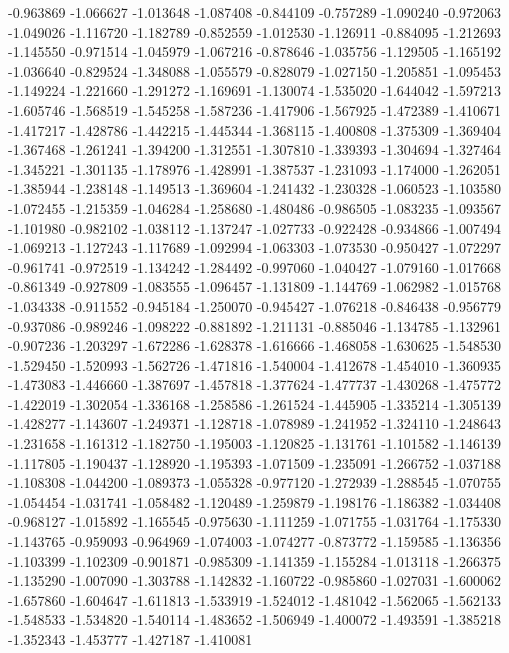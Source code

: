-0.963869
-1.066627
-1.013648
-1.087408
-0.844109
-0.757289
-1.090240
-0.972063
-1.049026
-1.116720
-1.182789
-0.852559
-1.012530
-1.126911
-0.884095
-1.212693
-1.145550
-0.971514
-1.045979
-1.067216
-0.878646
-1.035756
-1.129505
-1.165192
-1.036640
-0.829524
-1.348088
-1.055579
-0.828079
-1.027150
-1.205851
-1.095453
-1.149224
-1.221660
-1.291272
-1.169691
-1.130074
-1.535020
-1.644042
-1.597213
-1.605746
-1.568519
-1.545258
-1.587236
-1.417906
-1.567925
-1.472389
-1.410671
-1.417217
-1.428786
-1.442215
-1.445344
-1.368115
-1.400808
-1.375309
-1.369404
-1.367468
-1.261241
-1.394200
-1.312551
-1.307810
-1.339393
-1.304694
-1.327464
-1.345221
-1.301135
-1.178976
-1.428991
-1.387537
-1.231093
-1.174000
-1.262051
-1.385944
-1.238148
-1.149513
-1.369604
-1.241432
-1.230328
-1.060523
-1.103580
-1.072455
-1.215359
-1.046284
-1.258680
-1.480486
-0.986505
-1.083235
-1.093567
-1.101980
-0.982102
-1.038112
-1.137247
-1.027733
-0.922428
-0.934866
-1.007494
-1.069213
-1.127243
-1.117689
-1.092994
-1.063303
-1.073530
-0.950427
-1.072297
-0.961741
-0.972519
-1.134242
-1.284492
-0.997060
-1.040427
-1.079160
-1.017668
-0.861349
-0.927809
-1.083555
-1.096457
-1.131809
-1.144769
-1.062982
-1.015768
-1.034338
-0.911552
-0.945184
-1.250070
-0.945427
-1.076218
-0.846438
-0.956779
-0.937086
-0.989246
-1.098222
-0.881892
-1.211131
-0.885046
-1.134785
-1.132961
-0.907236
-1.203297
-1.672286
-1.628378
-1.616666
-1.468058
-1.630625
-1.548530
-1.529450
-1.520993
-1.562726
-1.471816
-1.540004
-1.412678
-1.454010
-1.360935
-1.473083
-1.446660
-1.387697
-1.457818
-1.377624
-1.477737
-1.430268
-1.475772
-1.422019
-1.302054
-1.336168
-1.258586
-1.261524
-1.445905
-1.335214
-1.305139
-1.428277
-1.143607
-1.249371
-1.128718
-1.078989
-1.241952
-1.324110
-1.248643
-1.231658
-1.161312
-1.182750
-1.195003
-1.120825
-1.131761
-1.101582
-1.146139
-1.117805
-1.190437
-1.128920
-1.195393
-1.071509
-1.235091
-1.266752
-1.037188
-1.108308
-1.044200
-1.089373
-1.055328
-0.977120
-1.272939
-1.288545
-1.070755
-1.054454
-1.031741
-1.058482
-1.120489
-1.259879
-1.198176
-1.186382
-1.034408
-0.968127
-1.015892
-1.165545
-0.975630
-1.111259
-1.071755
-1.031764
-1.175330
-1.143765
-0.959093
-0.964969
-1.074003
-1.074277
-0.873772
-1.159585
-1.136356
-1.103399
-1.102309
-0.901871
-0.985309
-1.141359
-1.155284
-1.013118
-1.266375
-1.135290
-1.007090
-1.303788
-1.142832
-1.160722
-0.985860
-1.027031
-1.600062
-1.657860
-1.604647
-1.611813
-1.533919
-1.524012
-1.481042
-1.562065
-1.562133
-1.548533
-1.534820
-1.540114
-1.483652
-1.506949
-1.400072
-1.493591
-1.385218
-1.352343
-1.453777
-1.427187
-1.410081
